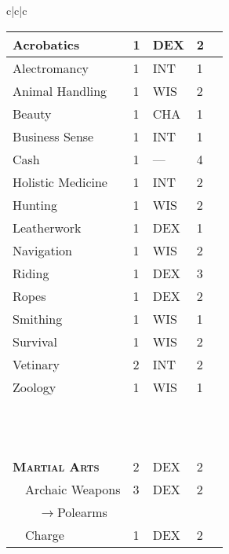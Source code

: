 \documentclass{article}
\begin{document}
\begin{tabular}{c|c|c}
\begin{tabular}{p{1.2in}|p{.15in}|p{.15in}|p{.15in}|p{.15in}}
    \hline
    \hline
    Acrobatics & 1 & \tiny{DEX} & 2 & \\
    \hline
    Alectromancy & 1  & \tiny{INT} & 1 & \\
    \hline
    Animal Handling & 1 & \tiny{WIS} & 2 & \\
    \hline
    Beauty & 1 & \tiny{CHA} & 1 & \\
    \hline
    Business Sense & 1 & \tiny{INT} & 1 & \\
    \hline
    Cash & 1 & --- & 4 & \\
    \hline
    Holistic Medicine & 1 & \tiny{INT} & 2 & \\
    \hline
    Hunting & 1 & \tiny{WIS} & 2 & \\
    \hline
    Leatherwork & 1 & \tiny{DEX} & 1 & \\
    \hline
    Navigation & 1 & \tiny{WIS} & 2 & \\
    \hline
    Riding & 1 & \tiny{DEX} & 3 & \\
    \hline
    Ropes & 1 & \tiny{DEX} & 2 & \\
    \hline
    Smithing & 1 & \tiny{WIS} & 1 & \\
    \hline
    Survival & 1 & \tiny{WIS} & 2 & \\
    \hline
    Vetinary & 2 & \tiny{INT} & 2 & \\
    \hline
    Zoology & 1 & \tiny{WIS} & 1 & \\
    \hline
    & & & & \\
    \hline
    & & & & \\
    \hline
    & & & & \\
    \hline
    & & & & \\
    \hline
    & & & & \\
    \hline
    & & & & \\
    \hline
    & & & & \\
    \hline
    & & & & \\
    \hline
    & & & & \\
    \hline
    & & & & \\
    \hline
    & & & & \\
    \hline
    & & & & \\
    \hline
    \hline
    \hline
    \textsc{\textbf{Martial Arts}} & 2 & \tiny{DEX} & 2 & \\
    \hline
    ~~Archaic Weapons & 3 & \tiny{DEX} & 2 & \\
    \hline
    ~~~~$\rightarrow$Polearms & & & & \\
    \hline
    ~~Charge & 1 & \tiny{DEX} & 2 & \\

\end{tabular}
\end{tabular}
\end{document}

